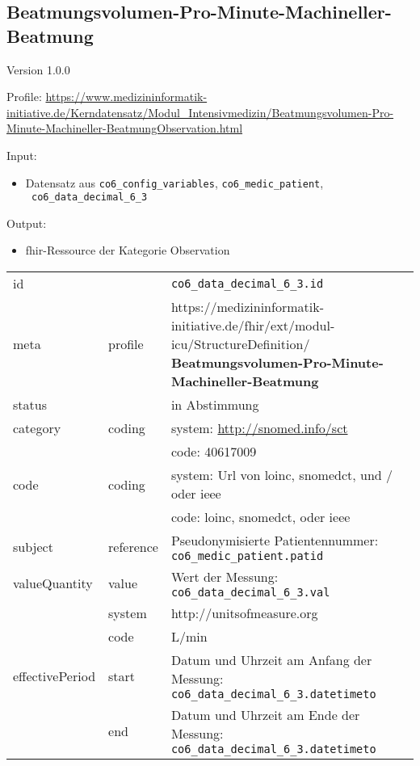 \subsection{Beatmungsvolumen-Pro-Minute-Machineller-Beatmung} 
\noindent Version 1.0.0

\noindent Profile: \url{https://www.medizininformatik-initiative.de/Kerndatensatz/Modul_Intensivmedizin/Beatmungsvolumen-Pro-Minute-Machineller-BeatmungObservation.html}

\noindent Input:
\begin{itemize}
	\item Datensatz aus \texttt{co6\_config\_variables}, \texttt{co6\_medic\_patient}, \\ \texttt{
co6\_data\_decimal\_6\_3}
\end{itemize}
Output:
\begin{itemize}
        \item \ac{fhir}-Ressource der Kategorie \glqq Observation\grqq{}
\end{itemize}
\begin{longtable}{|l|l|p{7.5cm}|}
        \hline
        \rowcolor{lightgray} \multicolumn{3}{|l|}{Data Mapping (inhaltlich)} \\ \hline
        id &  & \texttt{co6\_data\_decimal\_6\_3.id} \\ \hline
	meta & profile & https://medizininformatik-initiative.de/fhir/ext/modul-icu/StructureDefinition/\textbf{
Beatmungsvolumen-Pro-Minute-Machineller-Beatmung} \\ \hline 
	status &  & in Abstimmung  \\ \hline 
	category & coding & system: \url{http://snomed.info/sct} \\
\cline{3-3}
	& & code: 40617009 \\ \hline
	code & coding & system: Url von \ac{loinc}, \ac{snomedct}, und / oder \ac{ieee} \\ 
	\cline{3-3} 
	 &  & code: \ac{loinc}, \ac{snomedct}, oder \ac{ieee} \\ \hline
	subject & reference & Pseudonymisierte Patientennummer: \texttt{co6\_medic\_patient.patid} \\ \hline
	valueQuantity & value & Wert der Messung: \texttt{
co6\_data\_decimal\_6\_3.val} \\
        \cline{2-3}
         & system & http://unitsofmeasure.org \\
         \cline{2-3}
         & code &
L/min
\\ \hline
    effectivePeriod & start & Datum und Uhrzeit am Anfang der Messung: \texttt{
co6\_data\_decimal\_6\_3.datetimeto} \\
    \cline{2-3}
     & end & Datum und Uhrzeit am Ende der Messung: \texttt{
co6\_data\_decimal\_6\_3.datetimeto} \\ \hline
\end{longtable}


